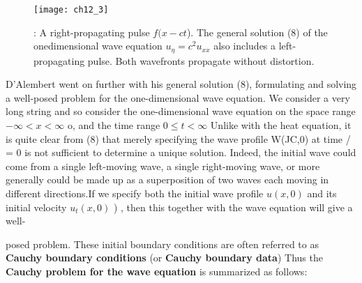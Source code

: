 \documentclass[../main.tex]{subfiles}
\begin{document}
\begin{figure}[H]
	\centering
	\texttt{[image: ch12\_3]}
	\caption{\textsf{: A right-propagating pulse $f(x - ct$). The general solution (8) of the onedimensional wave equation $u_\eta = c^2 u_{xx}$
also includes a left-propagating pulse. Both
wavefronts propagate without distortion.}}
	\label{pfig:ch12_3}
\end{figure}

D'Alembert went on further with his general solution (8), formulating and
solving a well-posed problem for the one-dimensional wave equation. We
consider a very long string and so consider the one-dimensional wave equation on
the space range $ -\infty <x< \infty$ o, and the time range $ 0 \leqslant t < \infty $ 
Unlike with the heat
equation, it is quite clear from (8) that merely specifying the wave profile W(JC,0) at
time / = 0 is not sufficient to determine a unique solution. Indeed, the initial wave
could come from a single left-moving wave, a single right-moving wave, or more
generally could be made up as a superposition of two waves each moving in
different directions.If we specify both the initial wave profile $u(x,0)$ and its
initial velocity $u_t(x,0)$ ) , then this together with the wave equation will give a well-


posed problem. These initial boundary conditions are often referred to as \textbf{Cauchy
boundary conditions}  (or \textbf{Cauchy boundary data}) Thus the \textbf{Cauchy problem
for the wave equation} is summarized as follows: 
\end{document}
